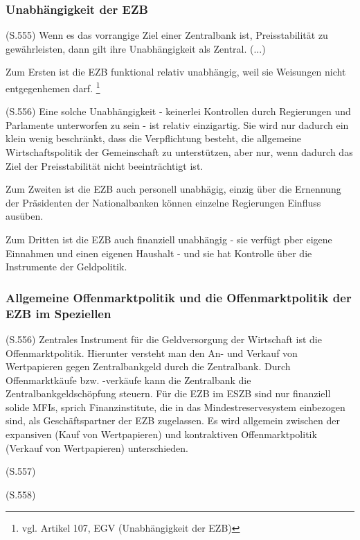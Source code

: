\documentclass[
      onecolumn,
      a4paper,
      abstracton,
      parskip=half
      ,final
      ]{scrartcl}
\begin{document}
\subsubsection{Unabhängigkeit der EZB}
(S.555)
Wenn es das vorrangige Ziel einer Zentralbank ist, Preisstabilität zu gewährleisten, dann gilt ihre Unabhängigkeit als Zentral. (...)

Zum Ersten ist die EZB funktional relativ unabhängig, weil sie Weisungen nicht entgegenhemen darf. \footnote[34]{vgl. Artikel 107, EGV (Unabhängigkeit der EZB)}

(S.556)
Eine solche Unabhängigkeit - keinerlei Kontrollen durch Regierungen und Parlamente unterworfen zu sein -  ist relativ einzigartig. Sie wird nur dadurch ein klein wenig beschränkt, dass die Verpflichtung besteht, die allgemeine Wirtschaftspolitik der Gemeinschaft zu unterstützen, aber nur, wenn dadurch das Ziel der Preisstabilität nicht beeinträchtigt ist.

Zum Zweiten ist die EZB auch personell unabhägig, einzig über die Ernennung der Präsidenten der Nationalbanken können einzelne Regierungen Einfluss ausüben.

Zum Dritten ist die EZB auch finanziell unabhängig - sie verfügt pber eigene Einnahmen und einen eigenen Haushalt - und sie hat Kontrolle über die Instrumente der Geldpolitik.

\subsubsection{Allgemeine Offenmarktpolitik und die Offenmarktpolitik der EZB im Speziellen}

(S.556)
Zentrales Instrument für die Geldversorgung der Wirtschaft ist die Offenmarktpolitik. Hierunter versteht man den An- und Verkauf von Wertpapieren gegen Zentralbankgeld durch die Zentralbank.
Durch Offenmarktkäufe bzw. -verkäufe kann die Zentralbank die Zentralbankgeldschöpfung steuern. Für die EZB im ESZB sind nur finanziell solide MFIs, sprich Finanzinstitute, die in das Mindestreservesystem einbezogen sind, als Geschäftspartner der EZB zugelassen.
Es wird allgemein zwischen der expansiven (Kauf von Wertpapieren) und kontraktiven Offenmarktpolitik (Verkauf von Wertpapieren) unterschieden.

(S.557)



(S.558)
\end{document}

